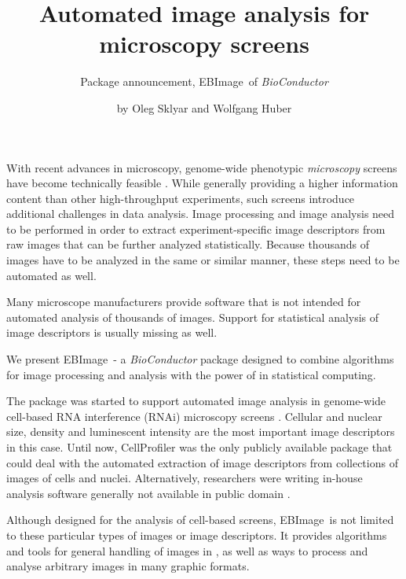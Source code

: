 
\newcommand{\lib}[1]{{\normalfont\textsf{#1}}}
\newcommand{\EBImage}{{\normalfont\textsf{EBImage}}}

\title{Automated image analysis for microscopy screens}
\subtitle{Package announcement, \EBImage\ of {\em BioConductor}}
\author{by Oleg Sklyar and Wolfgang Huber}

\maketitle

With recent advances in microscopy, genome-wide phenotypic {\em microscopy} screens have become technically feasible \citep{R:Neumann:2006}. While generally providing a higher information content than other high-throughput experiments, such screens introduce additional challenges in data analysis. Image processing and image analysis need to be performed in order to extract experiment-specific image descriptors from raw images that can be further analyzed statistically. Because thousands of images have to be analyzed in the same or similar manner, these steps need to be automated as well.

Many microscope manufacturers provide software that is not intended for automated analysis of thousands of images. Support for statistical analysis of image descriptors is usually missing as well.

We present \EBImage\ - a {\em BioConductor} package designed to combine algorithms for image processing and analysis with the power of \R{} in statistical computing.

The package was started to support automated image analysis in genome-wide cell-based RNA interference (RNAi) microscopy screens \citep{R:Boutros:2004}. Cellular and nuclear size, density and luminescent intensity are the most important image descriptors in this case. Until now, \lib{CellProfiler} \citep{R:Carpenter:prep} was the only publicly available package that could deal with the automated extraction of image descriptors from collections of images of cells and nuclei. Alternatively, researchers were writing in-house analysis software generally not available in public domain \citep{R:Neumann:2006}.

Although designed for the analysis of cell-based screens, \EBImage\ is not limited to these particular types of images or image descriptors. It provides algorithms and tools for general handling of images in \R{}, as well as ways to process and analyse arbitrary images in many graphic formats.

